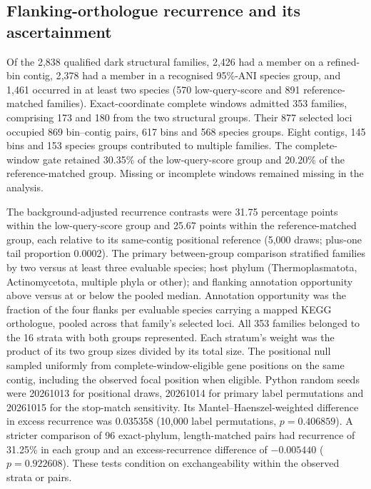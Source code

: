 \documentclass[11pt]{article}
\begin{document}
\subsection*{Flanking-orthologue recurrence and its ascertainment}
Of the 2{,}838 qualified dark structural families, 2{,}426 had a member on a refined-bin contig,
2{,}378 had a member in a recognised 95\%-ANI species group, and 1{,}461 occurred in at least
two species (570 low-query-score and 891 reference-matched families).
Exact-coordinate complete windows admitted 353 families, comprising 173 and 180 from the two
structural groups. Their 877 selected loci occupied 869 bin--contig pairs, 617 bins and 568
species groups. Eight contigs, 145 bins and 153 species groups contributed to multiple families.
The complete-window gate retained 30.35\% of the low-query-score group and 20.20\% of the
reference-matched group. Missing or incomplete windows remained missing in the analysis.

The background-adjusted recurrence contrasts were 31.75 percentage points within the
low-query-score group and 25.67 points within the reference-matched group, each relative to
its same-contig positional reference (5{,}000 draws; plus-one tail proportion 0.0002).
The primary between-group comparison stratified families by two versus at least three
evaluable species; host phylum (Thermoplasmatota, Actinomycetota, multiple phyla or other);
and flanking annotation opportunity above versus at or below the pooled median. Annotation
opportunity was the fraction of the four flanks per evaluable species carrying a mapped KEGG
orthologue, pooled across that family's selected loci. All 353
families belonged to the 16 strata with both groups represented. Each stratum's weight was
the product of its two group sizes divided by its total size. The positional null sampled
uniformly from complete-window-eligible gene positions on the same contig, including the
observed focal position when eligible. Python random seeds were 20261013 for positional draws,
20261014 for primary label permutations and 20261015 for the stop-match sensitivity. Its Mantel--Haenszel-weighted difference in excess recurrence was
0.035358 (10{,}000 label permutations, $p=0.406859$). A stricter comparison of 96 exact-phylum,
length-matched pairs had recurrence of 31.25\% in each group and an excess-recurrence difference
of $-0.005440$ ($p=0.922608$). These tests condition on exchangeability within the observed
strata or pairs.
\end{document}
